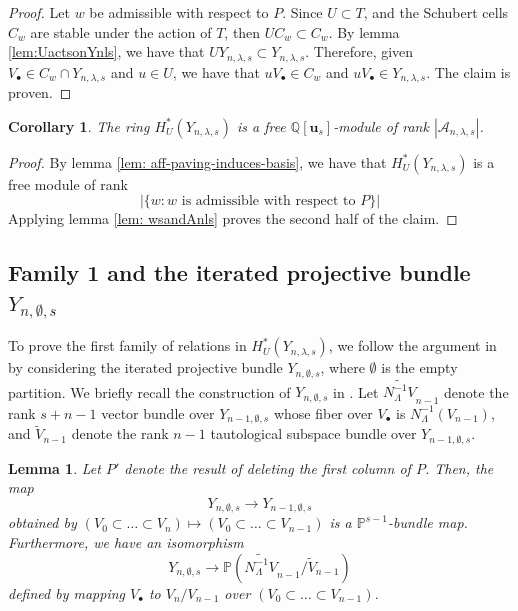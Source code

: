 \documentclass[11pt]{amsart}
\numberwithin{equation}{section}
\newtheorem{corollary}[theorem]{Corollary}
\newtheorem{lemma}[theorem]{Lemma}
\theoremstyle{definition}
\newcommand{\AAA}{{\mathcal{A}}}
\newcommand{\QQ}{{\mathbb{Q}}}
\newcommand{\PP}{{\mathbb{P}}}
\newcommand{\uuu}{{\mathbf{u}}}
\begin{document}
\begin{proof}
    Let $w$ be admissible with respect to $P$. Since $U \subset T$, and the Schubert cells $C_w$ are stable under the action of $T$, then $UC_w \subset C_w$. By lemma \ref{lem:UactsonYnls}, we have that $UY_{n,\lambda,s} \subset Y_{n,\lambda,s}$. Therefore, given $V_\bullet \in C_w \cap Y_{n,\lambda,s}$ and $u \in U$, we have that $uV_\bullet \in C_w$ and $uV_\bullet \in Y_{n,\lambda,s}$. The claim is proven.
\end{proof}

\begin{corollary}\label{cor: moduledim2}
    The ring $H^*_U(Y_{n,\lambda,s})$ is a free $\QQ[\uuu_s]$-module of rank $|\AAA_{n,\lambda,s}|$.
\end{corollary}

\begin{proof}
    By lemma \ref{lem: aff-paving-induces-basis}, we have that $H^*_U(Y_{n,\lambda,s})$ is a free module of rank 
    \[
| \{w : w \text{ is admissible with respect to }P\}|
\]
    Applying lemma \ref{lem: wsandAnls} proves the second half of the claim.
\end{proof}



\subsection{Family 1 and the iterated projective bundle $Y_{n,\emptyset,s}$}

To prove the first family of relations in $H^*_U(Y_{n,\lambda,s})$, we follow the argument in \cite{GLW} by considering the iterated projective bundle $Y_{n,\emptyset,s}$, where $\emptyset$ is the empty partition. We briefly recall the construction of $Y_{n,\emptyset,s}$ in \cite{GLW}. Let $\widetilde{N_\Lambda^{-1}V}_{n-1}$ denote the rank $s+n-1$ vector bundle over $Y_{n-1,\emptyset,s}$ whose fiber over $V_\bullet$ is $N_\Lambda^{-1}(V_{n-1})$, and $\widetilde{V}_{n-1}$ denote the rank $n-1$ tautological subspace bundle over $Y_{n-1,\emptyset,s}$.

\begin{lemma}\cite{GLW}\label{lem: iterated-proj-bundle}
    Let $P'$ denote the result of deleting the first column of $P$. Then, the map
    \[
Y_{n,\emptyset,s} \to Y_{n-1,\emptyset,s}
\]
    obtained by $(V_0 \subset \dots \subset V_n) \mapsto (V_0 \subset \dots \subset V_{n-1})$ is a $\PP^{s-1}$-bundle map. Furthermore, we have an isomorphism
    \begin{equation}\label{eq: ps-1bundle-map}
     Y_{n,\emptyset,s} \to \PP(\widetilde{N_\Lambda^{-1}V}_{n-1}/\widetilde{V}_{n-1})
    \end{equation}
    defined by mapping $V_\bullet$ to $V_n/V_{n-1}$ over $(V_0 \subset \dots \subset V_{n-1})$.
\end{lemma}
\end{document}
